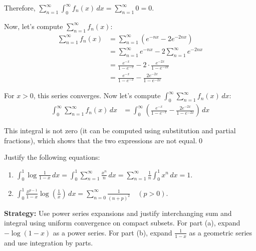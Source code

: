Therefore, $\sum_{n=1}^{\infty} \int_{0}^{\infty} f_n(x) \, dx = \sum_{n=1}^{\infty} 0 = 0$.

Now, let's compute $\sum_{n=1}^{\infty} f_n(x)$:
\begin{align*}
\sum_{n=1}^{\infty} f_n(x) &= \sum_{n=1}^{\infty} (e^{-nx} - 2e^{-2nx}) \\
&= \sum_{n=1}^{\infty} e^{-nx} - 2\sum_{n=1}^{\infty} e^{-2nx} \\
&= \frac{e^{-x}}{1 - e^{-x}} - 2 \cdot \frac{e^{-2x}}{1 - e^{-2x}} \\
&= \frac{e^{-x}}{1 - e^{-x}} - \frac{2e^{-2x}}{1 - e^{-2x}}
\end{align*}

For $x > 0$, this series converges. Now let's compute $\int_{0}^{\infty} \sum_{n=1}^{\infty} f_n(x) \, dx$:
\begin{align*}
\int_{0}^{\infty} \sum_{n=1}^{\infty} f_n(x) \, dx &= \int_{0}^{\infty} \left(\frac{e^{-x}}{1 - e^{-x}} - \frac{2e^{-2x}}{1 - e^{-2x}}\right) \, dx
\end{align*}

This integral is not zero (it can be computed using substitution and partial fractions), which shows that the two expressions are not equal.\qed


\begin{problembox}
Justify the following equations:
\begin{enumerate}[label=(\alph*)]
\item $\int_{0}^{1} \log \frac{1}{1-x} \, dx = \int_{0}^{1} \sum_{n=1}^{\infty} \frac{x^n}{n} \, dx = \sum_{n=1}^{\infty} \frac{1}{n} \int_{0}^{1} x^n \, dx = 1.$
\item $\int_{0}^{1} \frac{x^{p-1}}{1-x} \log \left( \frac{1}{x} \right) \, dx = \sum_{n=0}^{\infty} \frac{1}{(n+p)^2} \quad (p > 0).$
\end{enumerate}
\end{problembox}

\noindent\textbf{Strategy:} Use power series expansions and justify interchanging sum and integral using uniform convergence on compact subsets. For part (a), expand $-\log(1-x)$ as a power series. For part (b), expand $\frac{1}{1-x}$ as a geometric series and use integration by parts.

